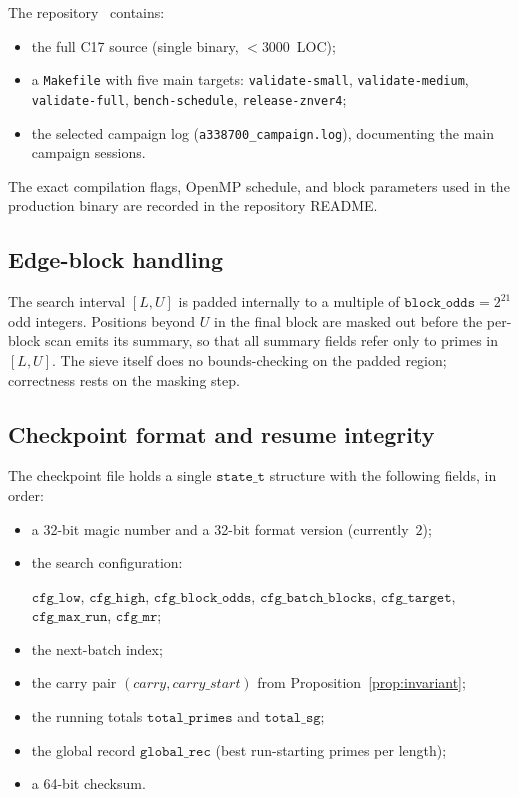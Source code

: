 \documentclass[11pt,a4paper]{article}
\theoremstyle{definition}
\begin{document}
The repository~\cite{repo} contains:

\begin{itemize}
\item the full C17 source (single binary, $<3000$~LOC);
\item a \texttt{Makefile} with five main targets:
\texttt{validate-small}, \texttt{validate-medium},
\texttt{validate-full}, \texttt{bench-schedule},
\texttt{release-znver4};
\item the selected campaign log
(\texttt{a338700\_campaign.log}), documenting the main campaign sessions.
\end{itemize}

The exact compilation flags, OpenMP schedule, and block parameters used
in the production binary are recorded in the repository README.

\subsection{Edge-block handling}
The search interval $[L,U]$ is padded internally to a multiple of
$\texttt{block\_odds} = 2^{21}$ odd integers. Positions beyond $U$ in the
final block are masked out before the per-block scan emits its summary,
so that all summary fields refer only to primes in $[L,U]$. The sieve
itself does no bounds-checking on the padded region; correctness rests
on the masking step.

\subsection{Checkpoint format and resume integrity}
The checkpoint file holds a single $\texttt{state\_t}$ structure with
the following fields, in order:
\begin{itemize}
\setlength{\itemsep}{0pt}
\item a 32-bit magic number and a 32-bit format version (currently~$2$);
\item the search configuration:
{\sloppy $\texttt{cfg\_low}$, $\texttt{cfg\_high}$,
$\texttt{cfg\_block\_odds}$, $\texttt{cfg\_batch\_blocks}$,
$\texttt{cfg\_target}$, $\texttt{cfg\_max\_run}$, $\texttt{cfg\_mr}$;\par}
\item the next-batch index;
\item the carry pair $(\textit{carry}, \textit{carry\_start})$ from
Proposition~\ref{prop:invariant};
\item the running totals $\texttt{total\_primes}$ and $\texttt{total\_sg}$;
\item the global record $\texttt{global\_rec}$ (best run-starting primes
per length);
\item a 64-bit checksum.
\end{itemize}
\end{document}
